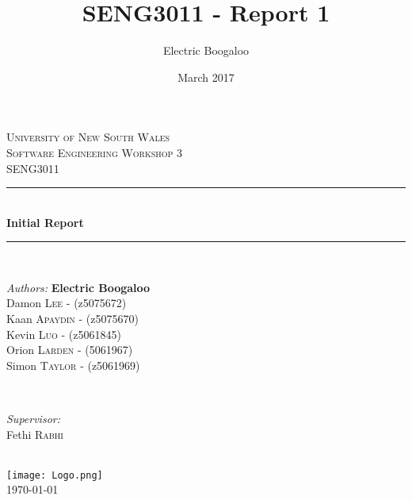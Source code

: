 \documentclass[a4paper, dvipsnames]{scrartcl}
\title{SENG3011 - Report 1}
\author{Electric Boogaloo}
\date{March 2017}
\begin{document}
\begin{titlepage}

\newcommand{\HRule}{\rule{\linewidth}{0.5mm}} %

\center %
 

\textsc{\LARGE University of New South Wales}\\[1.5cm] %
\textsc{\Large Software Engineering Workshop 3}\\[0.5cm] %
\textsc{\large SENG3011}\\[0.5cm] %


\HRule \\[0.4cm]
{ \huge \bfseries Initial Report}\\[0.1cm] %
\HRule \\[1.5cm]
 

\begin{minipage}{0.4\textwidth}
\begin{flushleft} \large
\emph{Authors:} \textbf{Electric Boogaloo}\\
Damon \textsc{Lee} - (z5075672) \\
Kaan \textsc{Apaydin} - (z5075670) \\
Kevin \textsc{Luo} - (z5061845) \\
Orion \textsc{Larden} - (5061967) \\
Simon \textsc{Taylor} - (z5061969) \\
\end{flushleft}
\end{minipage}
~
\begin{minipage}{0.4\textwidth}
\begin{flushright} \large
\emph{Supervisor:} \\
Fethi \textsc{Rabhi} %
\end{flushright}
\end{minipage}\\[2cm]




\texttt{[image: Logo.png]}\\[1.5cm] %
 

{\large \today}\\[3cm] 

\vfill %
\end{titlepage}
\newpage
\end{document}
